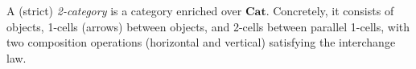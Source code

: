 A (strict) \emph{2-category} is a category enriched over $\mathbf{Cat}$. Concretely, it consists of objects, 1-cells (arrows) between objects, and 2-cells between parallel 1-cells, with two composition operations (horizontal and vertical) satisfying the interchange law.
